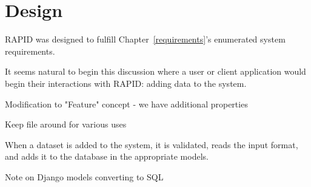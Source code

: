 \chapter{Design}
\label{design}

RAPID was designed to fulfill Chapter~\ref{requirements}'s enumerated system requirements.

It seems natural to begin this discussion where a user or client application would begin their interactions with RAPID: adding data to the system.



Modification to "Feature" concept - we have additional properties

Keep file around for various uses

When a dataset is added to the system, it is validated, reads the input format, and adds it to the database in the appropriate models.

Note on Django models converting to SQL




